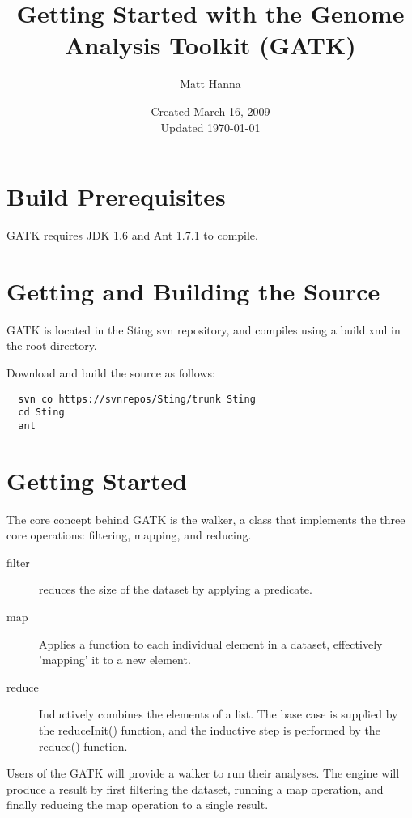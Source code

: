 \documentclass[11pt,fullpage]{article}
\begin{document}
\title{Getting Started with the Genome Analysis Toolkit (GATK)}
\author{Matt Hanna}
\date{Created March 16, 2009\\ Updated \today}
\maketitle

\section{Build Prerequisites}
GATK requires JDK 1.6 and Ant 1.7.1 to compile.

\section{Getting and Building the Source}
GATK is located in the Sting svn repository, and
compiles using a build.xml in the root directory.

Download and build the source as follows:
\begin{verbatim}
  svn co https://svnrepos/Sting/trunk Sting
  cd Sting
  ant
\end{verbatim}

\section{Getting Started}
The core concept behind GATK is the walker, a class that implements the 
three core operations: filtering, mapping, and reducing.

\begin{description}
  \item [filter] reduces the size of the dataset by applying a predicate.  
  \item [map] Applies a function to each individual element in a dataset, 
    effectively 'mapping' it to a new element.
  \item [reduce] Inductively combines the elements of a list.  The base
    case is supplied by the reduceInit() function, and the inductive step
    is performed by the reduce() function.
\end{description}
Users of the GATK will provide a walker to run their analyses.  The engine
will produce a result by first filtering the dataset, running a map operation,
and finally reducing the map operation to a single result.  
\end{document}
